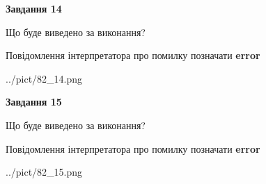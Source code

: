 \documentclass[11pt, ukrainian]{article}
\begin{document}
{\begin {large}
{\begin {center}\textbf{Завдання 14}\end {center}}\par
Що буде виведено за виконання? \par
Повідомлення інтерпретатора про помилку позначати \textbf{error}

\begin{center}
	{../pict/82_14.png}
\end{center}
\newpage

{\begin {center}\textbf{Завдання 15}\end {center}}\par
Що буде виведено за виконання? \par
Повідомлення інтерпретатора про помилку позначати \textbf{error}

\begin{center}
	{../pict/82_15.png}
\end{center}
\newpage

\end {large}}
\end{document}

